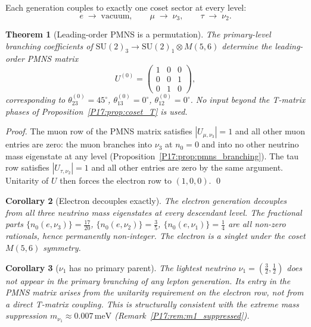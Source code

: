 \documentclass[11pt,a4paper]{article}
\newtheorem{theorem}{Theorem}[section]
\newtheorem{corollary}[theorem]{Corollary}
\theoremstyle{definition}\newtheorem{definition}[theorem]{Definition}
\theoremstyle{remark}
\newcommand{\SU}{\mathrm{SU}}
\begin{document}
Each generation couples to exactly one coset sector at every level:
\begin{equation}
  e \;\to\; \text{vacuum},\qquad
  \mu \;\to\; \nu_3,\qquad
  \tau \;\to\; \nu_2.
  \label{P17:eq:pmns_coupling}
\end{equation}

\begin{theorem}[Leading-order PMNS is a permutation]
\label{P17:thm:pmns_permutation}
The primary-level branching coefficients of $\SU(2)_3\to\SU(2)_1\otimes M(5,6)$
determine the leading-order PMNS matrix
\begin{equation}
  \boxed{U^{(0)}
  =\begin{pmatrix}1&0&0\\0&0&1\\0&1&0\end{pmatrix},}
  \label{P17:eq:PMNS_LO}
\end{equation}
corresponding to $\theta_{23}^{(0)}=45^\circ$, $\theta_{13}^{(0)}=0^\circ$,
$\theta_{12}^{(0)}=0^\circ$.
No input beyond the T-matrix phases of Proposition~\ref{P17:prop:coset_T} is used.
\end{theorem}

\begin{proof}
The muon row of the PMNS matrix satisfies $|U_{\mu,\nu_3}|=1$ and all other
muon entries are zero: the muon branches into $\nu_3$ at $n_0=0$ and into no
other neutrino mass eigenstate at any level (Proposition~\ref{P17:prop:pmns_branching}).
The tau row satisfies $|U_{\tau,\nu_2}|=1$ and all other entries are zero by
the same argument.  Unitarity of $U$ then forces the electron row to $(1,0,0)$.
\qed
\end{proof}

\begin{corollary}[Electron decouples exactly]
\label{P17:cor:electron_decouple}
The electron generation decouples from all three neutrino mass eigenstates
at every descendant level.  The fractional parts
$\{n_0(e,\nu_3)\}=\tfrac{17}{20}$,
$\{n_0(e,\nu_2)\}=\tfrac{3}{5}$,
$\{n_0(e,\nu_1)\}=\tfrac{1}{4}$
are all non-zero rationals, hence permanently non-integer.
The electron is a singlet under the coset $M(5,6)$ symmetry.
\end{corollary}

\begin{corollary}[$\nu_1$ has no primary parent]
\label{P17:cor:nu1_orphan}
The lightest neutrino $\nu_1=(\tfrac32,\tfrac12)$ does not appear in
the primary branching of any lepton generation.  Its entry in the PMNS
matrix arises from the unitarity requirement on the electron row, not
from a direct T-matrix coupling.  This is structurally consistent with
the extreme mass suppression $m_{\nu_1}\approx0.007\,\mathrm{meV}$
(Remark~\ref{P17:rem:m1_suppressed}).
\end{corollary}
\end{document}
